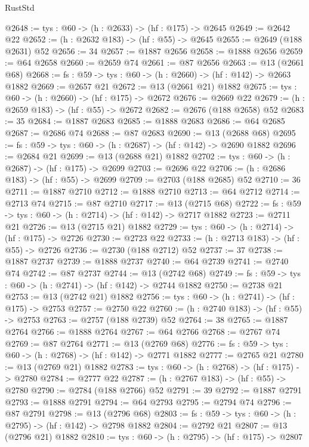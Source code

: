 \begin{lexlean}{RustStd}
\begin{coremodule}
@2648 := {tys : @60} -> (h : @2633) -> (hf : @175) -> @2645
@2649 := @2642 @22
@2652 := (h : @2632 @183) -> (hf : @55) -> @2645
@2655 := @2649 (@188 @2631) @52
@2656 := 34
@2657 := @1887 @2656
@2658 := @1888 @2656
@2659 := @64 @2658
@2660 := @2659 @74
@2661 := @87 @2656
@2663 := @13 (@2661 @68)
@2668 := {fs : @59} -> {tys : @60} -> (h : @2660) -> (hf : @142) -> @2663 @1882
@2669 := @2657 @21
@2672 := @13 (@2661 @21) @1882
@2675 := {tys : @60} -> (h : @2660) -> (hf : @175) -> @2672
@2676 := @2669 @22
@2679 := (h : @2659 @183) -> (hf : @55) -> @2672
@2682 := @2676 (@188 @2658) @52
@2683 := 35
@2684 := @1887 @2683
@2685 := @1888 @2683
@2686 := @64 @2685
@2687 := @2686 @74
@2688 := @87 @2683
@2690 := @13 (@2688 @68)
@2695 := {fs : @59} -> {tys : @60} -> (h : @2687) -> (hf : @142) -> @2690 @1882
@2696 := @2684 @21
@2699 := @13 (@2688 @21) @1882
@2702 := {tys : @60} -> (h : @2687) -> (hf : @175) -> @2699
@2703 := @2696 @22
@2706 := (h : @2686 @183) -> (hf : @55) -> @2699
@2709 := @2703 (@188 @2685) @52
@2710 := 36
@2711 := @1887 @2710
@2712 := @1888 @2710
@2713 := @64 @2712
@2714 := @2713 @74
@2715 := @87 @2710
@2717 := @13 (@2715 @68)
@2722 := {fs : @59} -> {tys : @60} -> (h : @2714) -> (hf : @142) -> @2717 @1882
@2723 := @2711 @21
@2726 := @13 (@2715 @21) @1882
@2729 := {tys : @60} -> (h : @2714) -> (hf : @175) -> @2726
@2730 := @2723 @22
@2733 := (h : @2713 @183) -> (hf : @55) -> @2726
@2736 := @2730 (@188 @2712) @52
@2737 := 37
@2738 := @1887 @2737
@2739 := @1888 @2737
@2740 := @64 @2739
@2741 := @2740 @74
@2742 := @87 @2737
@2744 := @13 (@2742 @68)
@2749 := {fs : @59} -> {tys : @60} -> (h : @2741) -> (hf : @142) -> @2744 @1882
@2750 := @2738 @21
@2753 := @13 (@2742 @21) @1882
@2756 := {tys : @60} -> (h : @2741) -> (hf : @175) -> @2753
@2757 := @2750 @22
@2760 := (h : @2740 @183) -> (hf : @55) -> @2753
@2763 := @2757 (@188 @2739) @52
@2764 := 38
@2765 := @1887 @2764
@2766 := @1888 @2764
@2767 := @64 @2766
@2768 := @2767 @74
@2769 := @87 @2764
@2771 := @13 (@2769 @68)
@2776 := {fs : @59} -> {tys : @60} -> (h : @2768) -> (hf : @142) -> @2771 @1882
@2777 := @2765 @21
@2780 := @13 (@2769 @21) @1882
@2783 := {tys : @60} -> (h : @2768) -> (hf : @175) -> @2780
@2784 := @2777 @22
@2787 := (h : @2767 @183) -> (hf : @55) -> @2780
@2790 := @2784 (@188 @2766) @52
@2791 := 39
@2792 := @1887 @2791
@2793 := @1888 @2791
@2794 := @64 @2793
@2795 := @2794 @74
@2796 := @87 @2791
@2798 := @13 (@2796 @68)
@2803 := {fs : @59} -> {tys : @60} -> (h : @2795) -> (hf : @142) -> @2798 @1882
@2804 := @2792 @21
@2807 := @13 (@2796 @21) @1882
@2810 := {tys : @60} -> (h : @2795) -> (hf : @175) -> @2807

\end{coremodule}
\end{lexlean}
